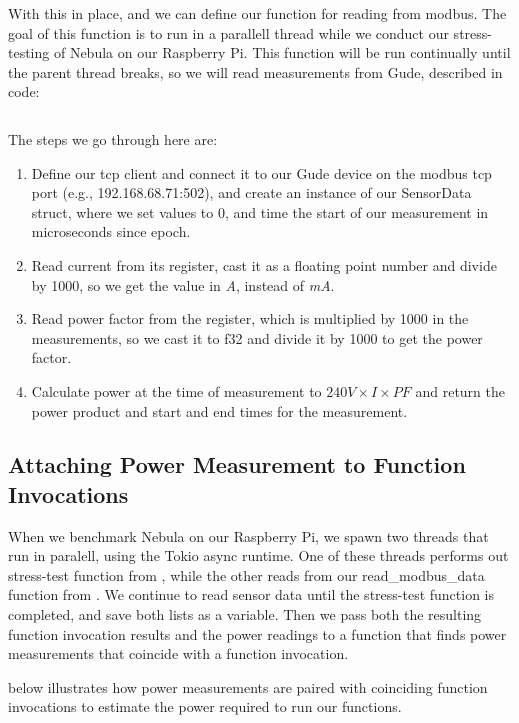 \documentclass[
  table]{report}
\providecommand{\tightlist}{%
  \setlength{\itemsep}{0pt}\setlength{\parskip}{0pt}}
\begin{document}
With this in place, and we can define our function for reading from
modbus. The goal of this function is to run in a parallell thread while
we conduct our stress-testing of Nebula on our Raspberry Pi. This
function will be run continually until the parent thread breaks, so we
will read measurements from Gude, described in code:

\inputminted[firstline = 0, lastline = 31]{rust}{assets/code/modbus.rs}

The steps we go through here are:

\begin{enumerate}
\def\labelenumi{\arabic{enumi}.}
\tightlist
\item
  Define our tcp client and connect it to our Gude device on the modbus
  tcp port (e.g., 192.168.68.71:502), and create an instance of our
  SensorData struct, where we set values to 0, and time the start of our
  measurement in microseconds since epoch.
\item
  Read current from its register, cast it as a floating point number and
  divide by 1000, so we get the value in \emph{A}, instead of \emph{mA}.
\item
  Read power factor from the register, which is multiplied by 1000 in
  the measurements, so we cast it to f32 and divide it by 1000 to get
  the power factor.
\item
  Calculate power at the time of measurement to \(240V \times I \times
  PF\) and return the power product and start and end times for the
  measurement.
\end{enumerate}

\subsection{Attaching Power Measurement to Function Invocations}

When we benchmark Nebula on our Raspberry Pi, we spawn two threads that
run in paralell, using the Tokio async runtime. One of these threads
performs out stress-test function from , while
the other reads from our read\_modbus\_data function from
. We continue to read sensor data until the
stress-test function is completed, and save both lists as a variable.
Then we pass both the resulting function invocation results and the
power readings to a function that finds power measurements that coincide
with a function invocation.

 below illustrates how power
measurements are paired with coinciding function invocations to estimate
the power required to run our functions.
\end{document}
